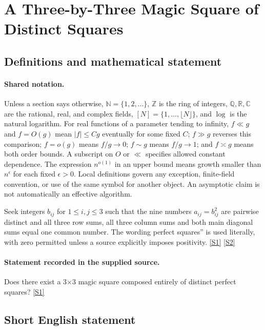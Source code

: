 \documentclass[11pt,a4paper]{article}
\newcommand{\N}{\mathbb{N}}
\newcommand{\Z}{\mathbb{Z}}
\newcommand{\Q}{\mathbb{Q}}
\newcommand{\R}{\mathbb{R}}
\newcommand{\C}{\mathbb{C}}
\newcommand{\sref}[2]{\hyperlink{source:#1:#2}{[S#2]}}
\begin{document}
\section{A Three-by-Three Magic Square of Distinct Squares}\label{statement}


\subsection{Definitions and mathematical statement}

\paragraph{Shared notation.}Unless a section says otherwise, $\N=\{1,2,\ldots\}$,
$\Z$ is the ring of integers, $\Q,\R,\C$ are the rational, real, and complex
fields, $[N]=\{1,\ldots,\lfloor N\rfloor\}$, and $\log$ is the natural
logarithm. For real functions of a parameter tending to infinity,
$f\ll g$ and $f=O(g)$ mean $|f|\leq Cg$ eventually for some fixed $C$;
$f\gg g$ reverses this comparison; $f=o(g)$ means $f/g\to0$;
$f\sim g$ means $f/g\to1$; and $f\asymp g$ means both order bounds.
A subscript on $O$ or $\ll$ specifies allowed constant dependence.
The expression $n^{o(1)}$ in an upper bound means growth smaller than
$n^\epsilon$ for each fixed $\epsilon>0$. Local definitions govern any
exception, finite-field convention, or use of the same symbol for another
object. An asymptotic claim is not automatically an effective algorithm.



Seek integers $b_{ij}$ for $1\leq i,j\leq3$ such that the nine numbers $a_{ij}=b_{ij}^2$ are pairwise distinct and all three row sums, all three column sums and both main diagonal sums equal one common number. The wording perfect squares'' is used literally, with zero permitted unless a source explicitly imposes positivity. \sref{statement}{1} \sref{statement}{2}

\paragraph{Statement recorded in the supplied source.}
Does there exist a 3\ensuremath{×}3 magic square composed entirely of distinct perfect squares? \sref{statement}{1}

\subsection{Short English statement}
\end{document}
